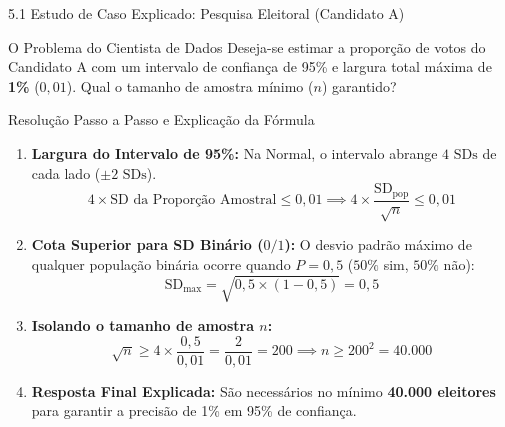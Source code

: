 \documentclass[10pt, aspectratio=169]{beamer}
\begin{document}
\begin{frame}{5.1 Estudo de Caso Explicado: Pesquisa Eleitoral (Candidato A)}
	\vspace{-0.2cm}
    \begin{block}{O Problema do Cientista de Dados}
        Deseja-se estimar a proporção de votos do Candidato A com um intervalo de confiança de 95\% e largura total máxima de \textbf{1\%} ($0{,}01$).
        Qual o tamanho de amostra mínimo ($n$) garantido?
    \end{block}

    \begin{exampleblock}{Resolução Passo a Passo e Explicação da Fórmula}
        \begin{enumerate}
            \item \textbf{Largura do Intervalo de 95\%:} Na Normal, o intervalo abrange $4 \text{ SDs}$ de cada lado ($\pm 2 \text{ SDs}$).
            \vspace{-0.2cm}
                  \[ 4 \times \text{SD da Proporção Amostral} \le 0{,}01 \implies 4 \times \frac{\text{SD}_{\text{pop}}}{\sqrt{n}} \le 0{,}01 \]
            \vspace{-0.6cm}
            \item \textbf{Cota Superior para SD Binário ($0/1$):} O desvio padrão máximo de qualquer população binária ocorre quando $P=0{,}5$ ($50\%$ sim, $50\%$ não):
            \vspace{-0.2cm}
                  \[ \text{SD}_{\max} = \sqrt{0{,}5 \times (1 - 0{,}5)} = 0{,}5 \]
             \vspace{-0.6cm}
            \item \textbf{Isolando o tamanho de amostra $n$:}
            \vspace{-0.2cm}
                  \[ \sqrt{n} \ge 4 \times \frac{0{,}5}{0{,}01} = \frac{2}{0{,}01} = 200 \implies n \ge 200^2 = 40.000 \]
                  \vspace{-0.6cm}
            \item \textbf{Resposta Final Explicada:} São necessários no mínimo \textbf{40.000 eleitores} para garantir a precisão de 1\% em 95\% de confiança.
        \end{enumerate}
    \end{exampleblock}
\end{frame}
\end{document}
